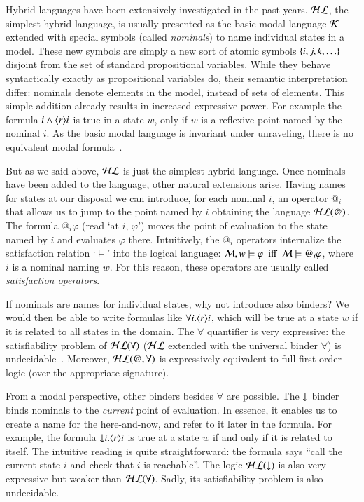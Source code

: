 Hybrid languages have been extensively investigated in the past
years. $\mathcal{HL}$, the simplest hybrid language, is usually presented as
the basic modal language $\mathcal{K}$ extended with special symbols (called
\emph{nominals}) to name individual states in a model. These new
symbols are simply a new sort of atomic symbols
$\{i,j,k,\ldots\}$ disjoint from the set of standard
propositional variables. While they behave syntactically exactly as
propositional variables do, their semantic interpretation differ:
nominals denote elements in the model, instead of sets of elements.
This simple addition already results in increased expressive power.
For example the formula $i \wedge \langle r \rangle i$ is true in a state $w$,
only if $w$ is a reflexive point named by the nominal $i$. As the
basic modal language is invariant under unraveling, there is no
equivalent modal formula~\cite{BRV01}.

But as we said above, $\mathcal{HL}$ is just the simplest hybrid language.
Once nominals have been added to the language, other natural
extensions arise.  Having names for states at our disposal we can
introduce, for each nominal $i$, an operator $@_i$ that allows us to
jump to the point named by $i$ obtaining the language $\mathcal{HL}(@)$. The
formula $@_i\varphi$ (read `at $i$, $\varphi$') moves the point of
evaluation to the state named by $i$ and evaluates $\varphi$ there.
Intuitively, the $@_i$ operators internalize the satisfaction
relation `$\models$' into the logical language: $\mathcal{M}, w \models
\varphi \mbox{ ~iff~ } \mathcal{M} \models @_i\varphi$, where $i$ is a
nominal naming $w$. For this reason, these operators are usually
called \emph{satisfaction operators}.

If nominals are names for individual states, why not introduce also
binders?  We would then be able to write formulas like $\forall
i.\langle r \rangle i$, which will be true at a state $w$ if it is related to
all states in the domain.  The $\forall$ quantifier is very
expressive: the satisfiability problem of $\mathcal{HL}(\forall)$  ($\mathcal{HL}$
extended with the universal binder $\forall$) is
undecidable~\cite{BS95}. Moreover, $\mathcal{HL}(@,\forall)$ is expressively
equivalent to full first-order logic (over the appropriate
signature).

From a modal perspective, other binders besides $\forall$ are
possible.  The ${\downarrow}$ binder binds nominals to the \emph{current}
point of evaluation. In essence, it enables us to create a name for
the here-and-now, and refer to it later in the formula.  For
example, the formula ${\downarrow} i.\langle r \rangle i$ is true at a state $w$ if
and only if it is related to itself.  The intuitive reading is quite
straightforward: the formula says ``call the current state $i$ and
check that $i$ is reachable''.  The logic $\mathcal{HL}({\downarrow})$ is also very
expressive but weaker than $\mathcal{HL}(\forall)$.  Sadly, its
satisfiability problem is also undecidable.

